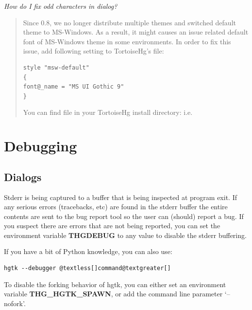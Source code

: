 \documentclass[letterpaper,10pt,english]{manual}
\begin{document}
\emph{How do I fix odd characters in dialog?}
\begin{quote}

Since 0.8, we no longer distribute multiple themes and switched
default theme to MS-Windows.  As a result, it might causes an issue
related default font of MS-Windows theme in some environments.  In
order to fix this issue, add following setting to TortoiseHg's
 file:

\begin{Verbatim}[commandchars=@\[\]]
style "msw-default"
{
font@_name = "MS UI Gothic 9"
}
\end{Verbatim}

You can find  file in your TortoiseHg install directory:
i.e. 
\end{quote}

\resetcurrentobjects
\hypertarget{--doc-debugging}{}

\chapter{Debugging}
\hypertarget{module-debugging}{}

\section{Dialogs}

Stderr is being captured to a buffer that is being inspected at program
exit.  If any serious errors (tracebacks, etc) are found in the stderr
buffer the entire contents are sent to the bug report tool so the user
can (should) report a bug.  If you suspect there are errors that are not
being reported, you can set the environment variable \textbf{THGDEBUG} to any
value to disable the stderr buffering.

If you have a bit of Python knowledge, you can also use:

\begin{Verbatim}[commandchars=@\[\]]
hgtk --debugger @textless[]command@textgreater[]
\end{Verbatim}

To disable the forking behavior of hgtk, you can either set an
environment variable \textbf{THG\_HGTK\_SPAWN}, or add the command line
parameter `--nofork'.
\end{document}
